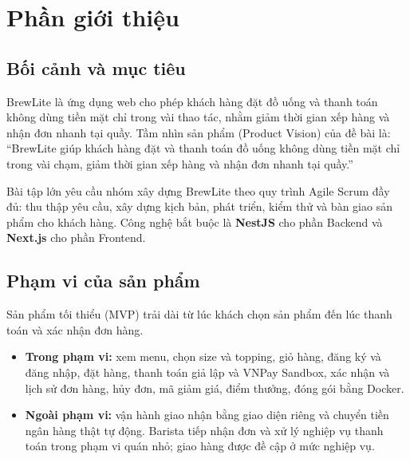 \documentclass[a4paper]{article}
\begin{document}
\thispagestyle{empty}

\newpage
\tableofcontents
\newpage

\section{Phần giới thiệu}
\subsection{Bối cảnh và mục tiêu}
BrewLite là ứng dụng web cho phép khách hàng đặt đồ uống và thanh toán không dùng tiền mặt chỉ trong vài thao tác, nhằm giảm thời gian xếp hàng và nhận đơn nhanh tại quầy. Tầm nhìn sản phẩm (Product Vision) của đề bài là: ``BrewLite giúp khách hàng đặt và thanh toán đồ uống không dùng tiền mặt chỉ trong vài chạm, giảm thời gian xếp hàng và nhận đơn nhanh tại quầy.''

Bài tập lớn yêu cầu nhóm xây dựng BrewLite theo quy trình Agile Scrum đầy đủ: thu thập yêu cầu, xây dựng kịch bản, phát triển, kiểm thử và bàn giao sản phẩm cho khách hàng. Công nghệ bắt buộc là \textbf{NestJS} cho phần Backend và \textbf{Next.js} cho phần Frontend.

\subsection{Phạm vi của sản phẩm}
Sản phẩm tối thiểu (MVP) trải dài từ lúc khách chọn sản phẩm đến lúc thanh toán và xác nhận đơn hàng.
\begin{itemize}
	\item \textbf{Trong phạm vi:} xem menu, chọn size và topping, giỏ hàng, đăng ký và đăng nhập, đặt hàng, thanh toán giả lập và VNPay Sandbox, xác nhận và lịch sử đơn hàng, hủy đơn, mã giảm giá, điểm thưởng, đóng gói bằng Docker.
	\item \textbf{Ngoài phạm vi:} vận hành giao nhận bằng giao diện riêng và chuyển tiền ngân hàng thật tự động. Barista tiếp nhận đơn và xử lý nghiệp vụ thanh toán trong phạm vi quán nhỏ; giao hàng được đề cập ở mức nghiệp vụ.
\end{itemize}
\end{document}
